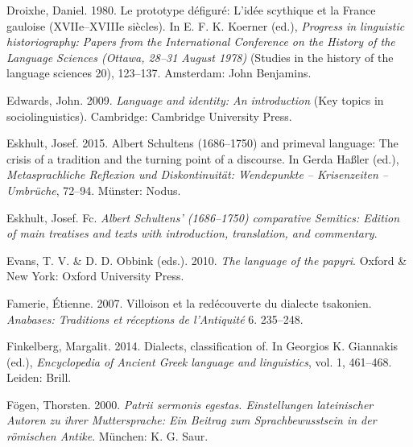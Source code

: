 \begin{styleStandard}
Droixhe, Daniel. 1980. Le prototype défiguré: L’idée scythique et la France gauloise (XVIIe–XVIIIe siècles). In E. F. K. Koerner (ed.), \textit{Progress in linguistic historiography: Papers from the International Conference on the History of the Language Sciences (Ottawa, 28–31 August 1978)} (Studies in the history of the language sciences 20), 123–137. Amsterdam: John Benjamins.
\end{styleStandard}

\begin{styleStandard}
Edwards, John. 2009. \textit{Language and identity: An introduction} (Key topics in sociolinguistics). Cambridge: Cambridge University Press.
\end{styleStandard}

\begin{styleStandard}
Eskhult, Josef. 2015. Albert Schultens (1686–1750) and primeval language: The crisis of a tradition and the turning point of a discourse. In Gerda Haßler (ed.), \textit{Metasprachliche Reflexion und Diskontinuität: Wendepunkte – Krisenzeiten – Umbrüche}, 72–94. Münster: Nodus.
\end{styleStandard}

\begin{styleStandard}
Eskhult, Josef. Fc. \textit{Albert Schultens’ (1686–1750) comparative Semitics: Edition of main treatises and texts with introduction, translation, and commentary}.
\end{styleStandard}

\begin{styleStandard}
Evans, T. V. \& D. D. Obbink (eds.). 2010. \textit{The language of the papyri}. Oxford \& New York: Oxford University Press.
\end{styleStandard}

\begin{styleStandard}
Famerie, Étienne. 2007. Villoison et la redécouverte du dialecte tsakonien. \textit{Anabases: Traditions et réceptions de l’Antiquité} 6. 235–248.
\end{styleStandard}

\begin{styleStandard}
Finkelberg, Margalit. 2014. Dialects, classification of. In Georgios K. Giannakis (ed.), \textit{Encyclopedia of Ancient Greek language and linguistics}, vol. 1, 461–468. Leiden: Brill.
\end{styleStandard}

\begin{styleStandard}
Fögen, Thorsten. 2000. \textit{Patrii sermonis egestas. Einstellungen lateinischer Autoren zu ihrer Muttersprache: Ein Beitrag zum Sprachbewusstsein in der römischen Antike}. München: K. G. Saur.
\end{styleStandard}

